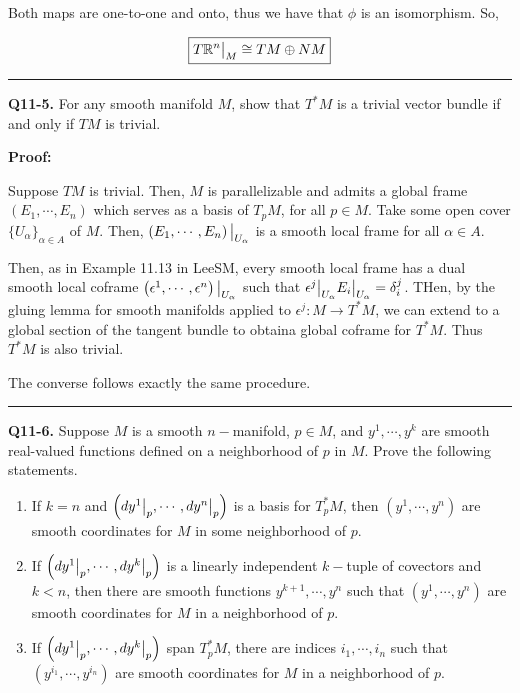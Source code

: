 \documentclass{article}
\newcommand{\R}{\mathbb{R}}
\newcommand{\restr}[2]{{%
  \left.\kern-\nulldelimiterspace %
  #1 %
  \vphantom{\big|} %
  \right|_{#2} %
  }}
\begin{document}
\vskip 0.5cm
Both maps are one-to-one and onto, thus we have that $\phi$ is an isomorphism. So,

\[ \boxed{\restr{T\R^n}{M} \cong TM \oplus NM} \]
 

\vskip 0.5cm
\hrule 
\vskip 0.5cm


\textbf{Q11-5.} For any smooth manifold $M$, show that $T^*M$ is a trivial vector bundle if and only if $TM$ is trivial. 

\vskip 0.5cm
\textbf{Proof:}


Suppose $TM$ is trivial. Then, $M$ is parallelizable and admits a global frame $\left(E_1, \cdots, E_n \right)$ which serves as a basis of $T_p M$, for all $p \in M$. Take some open cover $\{U_{\alpha}\}_{\alpha \in A}$ of $M$. Then, $\restr{\left(E_1, \cdots, E_n\right)}{U_{\alpha}}$ is a smooth local frame for all $\alpha \in A$. 

\vskip 0.5cm
Then, as in Example 11.13 in LeeSM, every smooth local frame has a dual smooth local coframe $\restr{\left(\epsilon^1, \cdots, \epsilon^n\right)}{U_{\alpha}}$ such that $\restr{\epsilon^j}{U_{\alpha}} \restr{E_i}{U_{\alpha}} = \delta^j_i$. THen, by the gluing lemma for smooth manifolds applied to $\epsilon^j : M \rightarrow T^*M$, we can extend to a global section of the tangent bundle to obtaina global coframe for $T^* M$. Thus $T^*M$ is also trivial. 

\vskip 0.5cm
The converse follows exactly the same procedure.


\vskip 0.5cm
\hrule 
\vskip 0.5cm



\textbf{Q11-6.} Suppose $M$ is a smooth $n-$manifold, $p \in M$, and $y^1, \cdots, y^k$ are smooth real-valued functions defined on a neighborhood of $p$ in $M$. Prove the following statements.
\begin{enumerate}[label=(\alph*)]
  \item If $k = n$ and $\left( \restr{dy^1}{p}, \cdots, \restr{dy^n}{p} \right)$ is a basis for $T_p^*M$, then $\left(y^1, \cdots, y^n\right)$ are smooth coordinates for $M$ in some neighborhood of $p$. 
  \item If $\left(\restr{dy^1}{p}, \cdots, \restr{dy^k}{p}\right)$ is a linearly independent $k-$tuple of covectors and $k < n$, then there are smooth functions $y^{k+1}, \cdots, y^n$ such that $\left(y^1, \cdots, y^{n}\right)$ are smooth coordinates for $M$ in a neighborhood of $p$.
  \item If $\left(\restr{dy^1}{p}, \cdots, \restr{dy^k}{p}\right)$ span $T_p^* M$, there are indices $i_1, \cdots, i_n$ such that $\left(y^{i_1}, \cdots, y^{i_n}\right)$ are smooth coordinates for $M$ in a neighborhood of $p$.
\end{enumerate}
\end{document}
